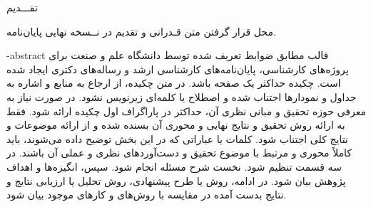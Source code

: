 \esalatPage
\mojavezPage


\newpage
\thispagestyle{empty}
\centerline{\Large \titlefont  تقـــدیم }
\begin{center}
	محل قرار گرفتن متن قـدرانی و تقدیم در نــسخه نهایی پایان‌نامه. 
	
\end{center}



\hypertarget{abstractfa}
{\fa-abstract{
        قالب مطابق ضوابط تعریف شده توسط دانشگاه علم و صنعت برای پروژه‌‌های کارشناسی، پایان‌نامه‌های کارشناسی ارشد و رساله‌های دکتری ایجاد شده است. 
        چکیده حداکثر یک صفحه باشد. در متن چکیده، از ارجاع به منابع و اشاره به جداول و نمودارها اجتناب شده و اصطلاح یا كلمه‌ای زیرنویس نشود. در صورت نیاز به معرفی حوزه تحقیق و مبانی نظری آن، حداکثر در پاراگراف اول چکیده ارائه شود. فقط به ارائه‌ روش تحقیق و نتایج نهایی و محوری آن بسنده شده و از ارائه‌ موضوعات و نتایج كلی اجتناب شود. 
        كلمات یا عباراتی كه در این بخش توضیح داده می‌شوند، باید كاملاً محوری و مرتبط با موضوع تحقیق و دست‌آوردهای نظری و عملی آن باشند. 
        در سه قسمت تنظیم شود. نخست شرح مسئله انجام شود. سپس، انگیزه‌ها و اهداف پژوهش بیان شود. در ادامه، روش یا طرح پیشنهادی، روش تحلیل یا ارزیابی نتایج و نتایج بدست آمده در مقایسه با روش‌های و کارهای موجود بیان شود.
\\}
}\label{abstractfa2} 

\abstractPage
\newpage\clearpage
